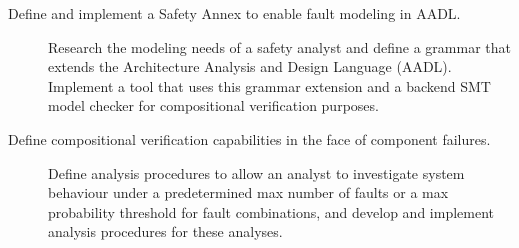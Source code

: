 \begin{description}
\item[Define and implement a Safety Annex to enable fault modeling in AADL.] Research the modeling needs of a safety analyst and define a grammar that extends the Architecture Analysis and Design Language (AADL). Implement a tool that uses this grammar extension and a backend SMT model checker for compositional verification purposes.


\item[Define compositional verification capabilities in the face of component failures.] Define analysis procedures to allow an analyst to investigate system behaviour under a predetermined max number of faults or a max probability threshold for fault combinations, and develop and implement analysis procedures for these analyses. 



\end{description}
